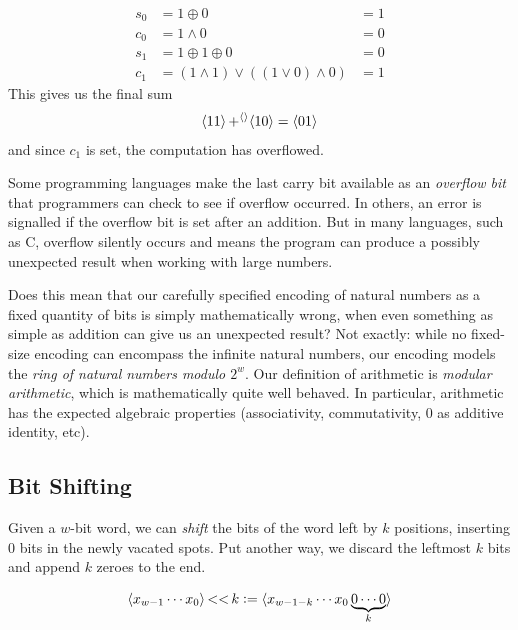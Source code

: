 \begin{example}
  \begin{align}
    s_{0} &= 1 \oplus 0 &= 1 \\
    c_{0} &= 1 \land 0 &= 0 \\
    s_{1} &= 1 \oplus 1 \oplus 0 &= 0 \\
    c_{1} &= (1 \land 1) \lor ((1\lor 0) \land 0) &= 1
  \end{align}
  This gives us the final sum
  \begin{align}
    \langle 11 \rangle \operatorname{+^{\langle\rangle}} \langle 10 \rangle = \langle 01 \rangle
  \end{align}
  and since $c_{1}$ is set, the computation has overflowed.
\end{example}

Some programming languages make the last carry bit available as an
\emph{overflow bit} that programmers can check to see if overflow
occurred.  In others, an error is signalled if the overflow bit is set
after an addition.  But in many languages, such as C, overflow
silently occurs and means the program can produce a possibly
unexpected result when working with large numbers.

Does this mean that our carefully specified encoding of natural
numbers as a fixed quantity of bits is simply mathematically wrong,
when even something as simple as addition can give us an unexpected
result?  Not exactly: while no fixed-size encoding can encompass the
infinite natural numbers, our encoding models the \emph{ring
  of natural numbers modulo $2^{w}$}.  Our definition of arithmetic is
\emph{modular arithmetic}, which is mathematically quite well behaved.
In particular, arithmetic has the expected algebraic properties
(associativity, commutativity, $0$ as additive identity, etc).

\subsection{Bit Shifting}
\label{sec:bitshift}

Given a $w$-bit word, we can \emph{shift} the bits of the word left by
$k$ positions, inserting $0$ bits in the newly vacated spots.  Put
another way, we discard the leftmost $k$ bits and append $k$ zeroes to
the end.

\begin{definition}
  \begin{align*}
  \langle x_{w-1}\cdots{}x_{0} \rangle \operatorname{<<} k \vcentcolon=
  \langle x_{w-1-k}\cdots{}x_{0} \underbrace{0\cdots 0}_{k} \rangle
  \end{align*}
  \label{def:bits-leftshift}
\end{definition}

